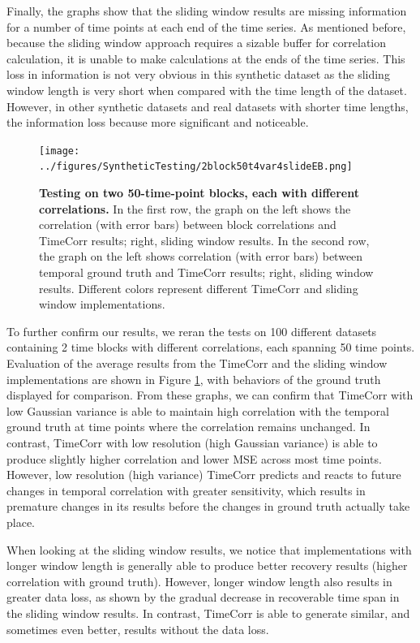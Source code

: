 \documentclass[11pt]{article}
\begin{document}
\begin{enumerate}
Finally, the graphs show that the sliding window results are missing information for a number of time points at each end of the time series. As mentioned before, because the sliding window approach requires a sizable buffer for correlation calculation, it is unable to make calculations at the ends of the time series. This loss in information is not very obvious in this synthetic dataset as the sliding window length is very short when compared with the time length of the dataset. However, in other synthetic datasets and real datasets with shorter time lengths, the information loss because more significant and noticeable.

\begin{figure}[!htb]
\texttt{[image: ../figures/SyntheticTesting/2block50t4var4slideEB.png]}
\caption{\textbf{Testing on two 50-time-point blocks, each with different correlations.} In the first row, the graph on the left shows the correlation (with error bars) between block correlations and TimeCorr results; right, sliding window results. In the second row, the graph on the left shows correlation (with error bars) between temporal ground truth and TimeCorr results; right, sliding window results. Different colors represent different TimeCorr and sliding window implementations.}
\label{fig:2block50t}
\end{figure}

To further confirm our results, we reran the tests on 100 different datasets containing 2 time blocks with different correlations, each spanning 50 time points. Evaluation of the average results from the TimeCorr and the sliding window implementations are shown in Figure \ref{fig:2block50t}, with behaviors of the ground truth displayed for comparison. From these graphs, we can confirm that TimeCorr with low Gaussian variance is able to maintain high correlation with the temporal ground truth at time points where the correlation remains unchanged. In contrast, TimeCorr with low resolution (high Gaussian variance) is able to produce slightly higher correlation and lower MSE across most time points. However, low resolution (high variance) TimeCorr predicts and reacts to future changes in temporal correlation with greater sensitivity, which results in premature changes in its results before the changes in ground truth actually take place.

When looking at the sliding window results, we notice that implementations with longer window length is generally able to produce better recovery results (higher correlation with ground truth). However, longer window length also results in greater data loss, as shown by the gradual decrease in recoverable time span in the sliding window results. In contrast, TimeCorr is able to generate similar, and sometimes even better, results without the data loss.


\end{enumerate}
\end{document}
